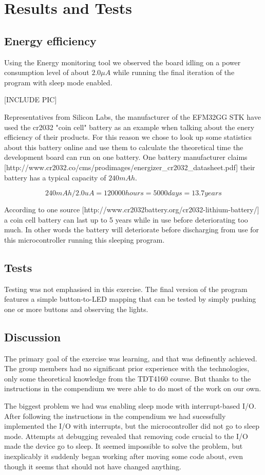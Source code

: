 \chapter{Results and Tests}

\section{Energy efficiency}
Using the Energy monitoring tool we observed the board idling on a power consumption level of about $2.0 \mu A$ while running the final iteration of the program with sleep mode enabled.

[INCLUDE PIC]

Representatives from Silicon Labs, the manufacturer of the EFM32GG STK have used the cr2032 "coin cell" battery as an example when talking about the enery efficiency of their products. For this reason we chose to look up some statistics about this battery online and use them to calculate the theoretical time the development board can run on one battery. One battery manufacturer claims [http://www.cr2032.co/cms/prodimages/energizer\_cr2032\_datasheet.pdf] their battery has a typical capacity of $240 mAh$.

\[
	240 mAh / 2.0 uA = 120 000 hours = 5000 days = 13.7 years
\]

According to one source [http://www.cr2032battery.org/cr2032-lithium-battery/] a coin cell battery can last up to 5 years while in use before deteriorating too much. In other words the battery will deteriorate before discharging from use for this microcontroller running this sleeping program.

\section{Tests}
Testing was not emphasised in this exercise. The final version of the program features a simple button-to-LED mapping that can be tested by simply pushing one or more buttons and observing the lights.

\section{Discussion}
The primary goal of the exercise was learning, and that was definently achieved. The group members had no significant prior experience with the technologies, only some theoretical knowledge from the TDT4160 course. But thanks to the instructions in the compendium we were able to do most of the work on our own.

The biggest problem we had was enabling sleep mode with interrupt-based I/O. After following the instructions in the compendium we had sucessfully implemented the I/O with interrupts, but the microcontroller did not go to sleep mode. Attempts at debugging revealed that removing code crucial to the I/O made the device go to sleep. It seemed impossible to solve the problem, but inexplicably it suddenly began working after moving some code about, even though it seems that should not have changed anything.
